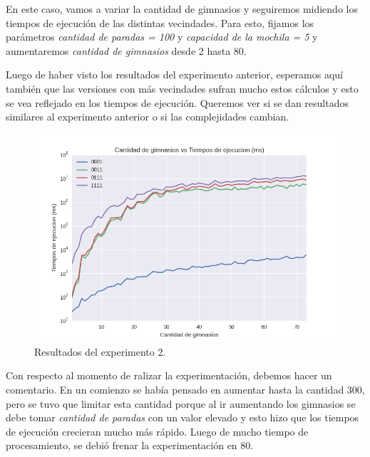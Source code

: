 \par En este caso, vamos a variar la cantidad de gimnasios y seguiremos midiendo los tiempos de ejecución de las distintas vecindades. Para esto, fijamos los parámetros \textit{cantidad de paradas = 100} y \textit{capacidad de la mochila = 5} y aumentaremos \textit{cantidad de gimnasios} desde 2 hasta 80.

\par Luego de haber visto los resultados del experimento anterior, esperamos aquí también que las versiones con más vecindades sufran mucho estos cálculos y esto se vea reflejado en los tiempos de ejecución. Queremos ver si se dan resultados similares al experimento anterior o si las complejidades cambian.

\begin{figure}[H]
  \begin{center}
    \includegraphics[width=\textwidth]{img/ejercicio3/exp2.png}
    \caption{Resultados del experimento 2.}
    \label{fig: ej3_exp2}
  \end{center}
\end{figure}

\par Con respecto al momento de ralizar la experimentación, debemos hacer un comentario. En un comienzo se había pensado en aumentar hasta la cantidad 300, pero se tuvo que limitar esta cantidad porque al ir aumentando los gimnasios se debe tomar \textit{cantidad de paradas} con un valor elevado y esto hizo que los tiempos de ejecución crecieran mucho más rápido. Luego de mucho tiempo de procesamiento, se debió frenar la experimentación en 80.


